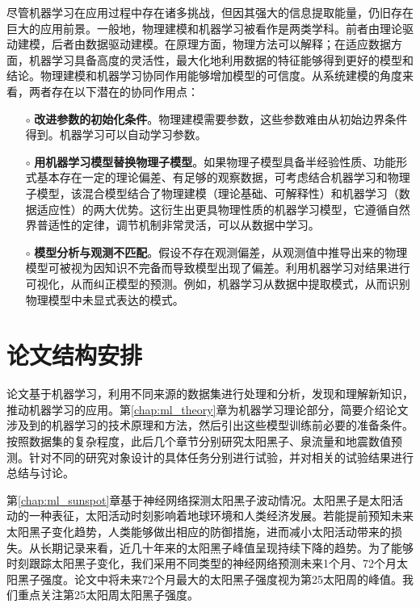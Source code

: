 尽管机器学习在应用过程中存在诸多挑战，但因其强大的信息提取能量，仍旧存在巨大的应用前景。一般地，物理建模和机器学习被看作是两类学科。前者由理论驱动建模，后者由数据驱动建模。在原理方面，物理方法可以解释；在适应数据方面，机器学习具备高度的灵活性，最大化地利用数据的特征能够得到更好的模型和结论。物理建模和机器学习协同作用能够增加模型的可信度\citep{karpatne2017theory,camps2018physics,karpatne2017physics}。从系统建模的角度来看，两者存在以下潜在的协同作用点：
\begin{enumerate}
  \item[$\circ$] \textbf{改进参数的初始化条件}。物理建模需要参数，这些参数难由从初始边界条件得到。机器学习可以自动学习参数。
  \item[$\circ$] \textbf{用机器学习模型替换物理子模型}。如果物理子模型具备半经验性质、功能形式基本存在一定的理论偏差、有足够的观察数据，可考虑结合机器学习和物理子模型，该混合模型结合了物理建模（理论基础、可解释性）和机器学习（数据适应性）的两大优势。这衍生出更具物理性质的机器学习模型，它遵循自然界普适性的定律，调节机制非常灵活，可以从数据中学习。
  \item[$\circ$] \textbf{模型分析与观测不匹配}。假设不存在观测偏差，从观测值中推导出来的物理模型可被视为因知识不完备而导致模型出现了偏差。利用机器学习对结果进行可视化，从而纠正模型的预测。例如，机器学习从数据中提取模式，从而识别物理模型中未显式表达的模式。
\end{enumerate}

\section{论文结构安排}\label{sec:intro_strcture}

论文基于机器学习，利用不同来源的数据集进行处理和分析，发现和理解新知识，推动机器学习的应用。第\ref{chap:ml_theory}章为机器学习理论部分，简要介绍论文涉及到的机器学习的技术原理和方法，然后引出这些模型训练前必要的准备条件。按照数据集的复杂程度，此后几个章节分别研究太阳黑子、泉流量和地震数值预测。针对不同的研究对象设计的具体任务分别进行试验，并对相关的试验结果进行总结与讨论。

第\ref{chap:ml_sunspot}章基于神经网络探测太阳黑子波动情况。太阳黑子是太阳活动的一种表征，太阳活动时刻影响着地球环境和人类经济发展。若能提前预知未来太阳黑子变化趋势，人类能够做出相应的防御措施，进而减小太阳活动带来的损失。从长期记录来看，近几十年来的太阳黑子峰值呈现持续下降的趋势。为了能够时刻跟踪太阳黑子变化，我们采用不同类型的神经网络预测未来1个月、72个月太阳黑子强度。论文中将未来72个月最大的太阳黑子强度视为第25太阳周的峰值。我们重点关注第25太阳周太阳黑子强度。

